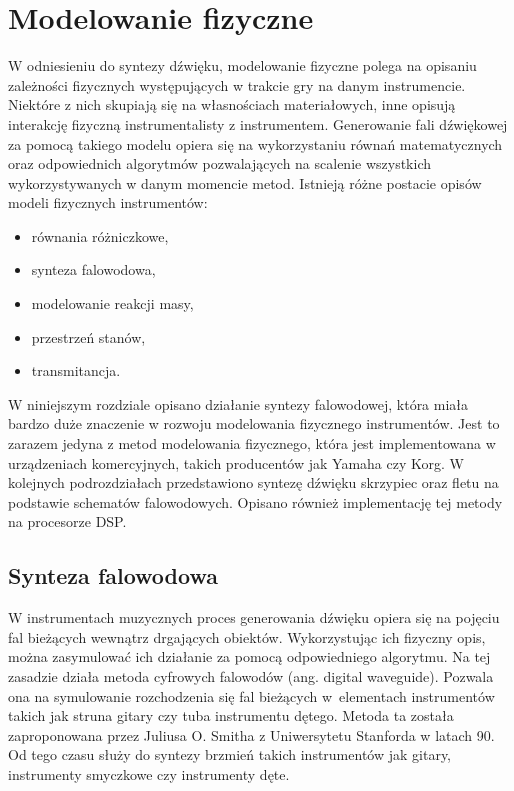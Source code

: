\chapter{Modelowanie fizyczne}
W odniesieniu do syntezy dźwięku, modelowanie fizyczne polega na opisaniu zależności fizycznych występujących w trakcie gry na danym instrumencie. Niektóre z nich skupiają się na własnościach materiałowych, inne opisują interakcję fizyczną instrumentalisty z instrumentem. Generowanie fali dźwiękowej za pomocą takiego modelu opiera się na wykorzystaniu równań matematycznych oraz odpowiednich algorytmów pozwalających na scalenie wszystkich wykorzystywanych w danym momencie metod. Istnieją różne postacie opisów modeli fizycznych instrumentów:
\begin{itemize}
	\item równania różniczkowe,
	\item synteza falowodowa,
	\item modelowanie reakcji masy,
	\item przestrzeń stanów,
	\item transmitancja.
\end{itemize}

W niniejszym rozdziale opisano działanie syntezy falowodowej, która miała bardzo duże znaczenie w rozwoju modelowania fizycznego instrumentów. Jest to zarazem jedyna z metod modelowania fizycznego, która jest implementowana w urządzeniach komercyjnych, takich producentów jak Yamaha czy Korg. W kolejnych podrozdziałach przedstawiono syntezę dźwięku skrzypiec oraz fletu na podstawie schematów falowodowych. Opisano również implementację tej metody na procesorze DSP.


\section{Synteza falowodowa}
W instrumentach muzycznych proces generowania dźwięku opiera się na pojęciu fal bieżących wewnątrz drgających obiektów. Wykorzystując ich fizyczny opis, można zasymulować ich działanie za pomocą odpowiedniego algorytmu. Na tej zasadzie działa metoda cyfrowych falowodów (ang. digital waveguide). Pozwala ona na symulowanie  rozchodzenia się fal bieżących w~elementach instrumentów takich jak struna gitary czy tuba instrumentu dętego. Metoda ta została zaproponowana przez Juliusa O. Smitha z Uniwersytetu Stanforda w latach 90. Od tego czasu służy do syntezy brzmień takich instrumentów jak gitary, instrumenty smyczkowe czy instrumenty dęte.

